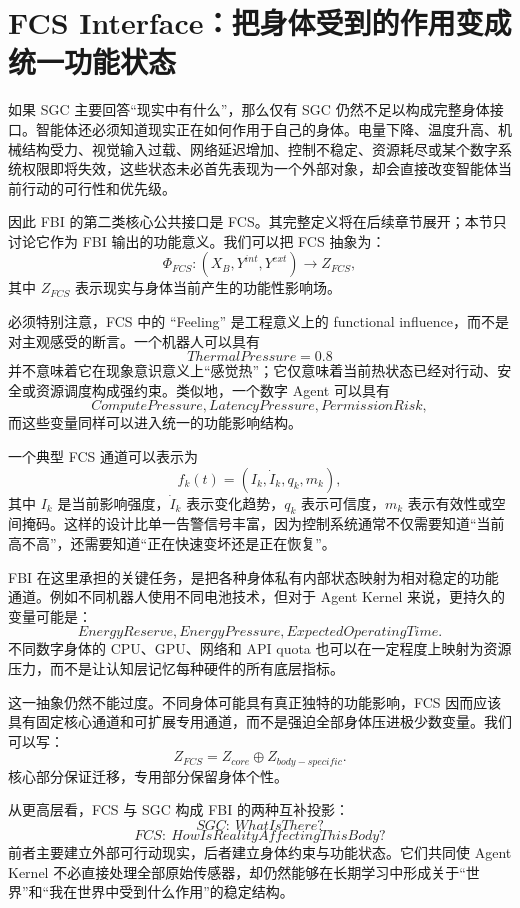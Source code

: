 \section{FCS Interface：把身体受到的作用变成统一功能状态}

如果 SGC 主要回答“现实中有什么”，那么仅有 SGC 仍然不足以构成完整身体接口。智能体还必须知道现实正在如何作用于自己的身体。电量下降、温度升高、机械结构受力、视觉输入过载、网络延迟增加、控制不稳定、资源耗尽或某个数字系统权限即将失效，这些状态未必首先表现为一个外部对象，却会直接改变智能体当前行动的可行性和优先级。

因此 FBI 的第二类核心公共接口是 FCS。其完整定义将在后续章节展开；本节只讨论它作为 FBI 输出的功能意义。我们可以把 FCS 抽象为：
\[
\Phi_{FCS}:
(X_B,Y^{int},Y^{ext})
\rightarrow
Z_{FCS},
\]
其中 \(Z_{FCS}\) 表示现实与身体当前产生的功能性影响场。

必须特别注意，FCS 中的 ``Feeling'' 是工程意义上的 functional influence，而不是对主观感受的断言。一个机器人可以具有
\[
ThermalPressure=0.8
\]
并不意味着它在现象意识意义上“感觉热”；它仅意味着当前热状态已经对行动、安全或资源调度构成强约束。类似地，一个数字 Agent 可以具有
\[
ComputePressure,
LatencyPressure,
PermissionRisk,
\]
而这些变量同样可以进入统一的功能影响结构。

一个典型 FCS 通道可以表示为
\[
f_k(t)
=
(
I_k,
\dot I_k,
q_k,
m_k
),
\]
其中 \(I_k\) 是当前影响强度，\(\dot I_k\) 表示变化趋势，\(q_k\) 表示可信度，\(m_k\) 表示有效性或空间掩码。这样的设计比单一告警信号丰富，因为控制系统通常不仅需要知道“当前高不高”，还需要知道“正在快速变坏还是正在恢复”。

FBI 在这里承担的关键任务，是把各种身体私有内部状态映射为相对稳定的功能通道。例如不同机器人使用不同电池技术，但对于 Agent Kernel 来说，更持久的变量可能是：
\[
EnergyReserve,
EnergyPressure,
ExpectedOperatingTime.
\]
不同数字身体的 CPU、GPU、网络和 API quota 也可以在一定程度上映射为资源压力，而不是让认知层记忆每种硬件的所有底层指标。

这一抽象仍然不能过度。不同身体可能具有真正独特的功能影响，FCS 因而应该具有固定核心通道和可扩展专用通道，而不是强迫全部身体压进极少数变量。我们可以写：
\[
Z_{FCS}
=
Z_{core}
\oplus
Z_{body-specific}.
\]
核心部分保证迁移，专用部分保留身体个性。

从更高层看，FCS 与 SGC 构成 FBI 的两种互补投影：
\[
\boxed{
SGC:\ WhatIsThere?
}
\]
\[
\boxed{
FCS:\ HowIsRealityAffectingThisBody?
}
\]
前者主要建立外部可行动现实，后者建立身体约束与功能状态。它们共同使 Agent Kernel 不必直接处理全部原始传感器，却仍然能够在长期学习中形成关于“世界”和“我在世界中受到什么作用”的稳定结构。

